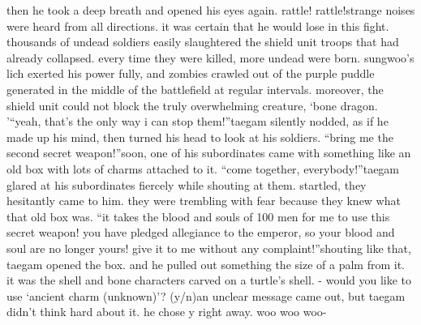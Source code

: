 then he took a deep breath and opened his eyes again.
rattle! rattle!strange noises were heard from all directions.
 it was certain that he would lose in this fight.
 thousands of undead soldiers easily slaughtered the shield unit troops that had already collapsed.
 every time they were killed, more undead were born.
 sungwoo’s lich exerted his power fully, and zombies crawled out of the purple puddle generated in the middle of the battlefield at regular intervals.
moreover, the shield unit could not block the truly overwhelming creature, ‘bone dragon.
’“yeah, that’s the only way i can stop them!”taegam silently nodded, as if he made up his mind, then turned his head to look at his soldiers.
“bring me the second secret weapon!”soon, one of his subordinates came with something like an old box with lots of charms attached to it.
“come together, everybody!”taegam glared at his subordinates fiercely while shouting at them.
startled, they hesitantly came to him.
 they were trembling with fear because they knew what that old box was.
“it takes the blood and souls of 100 men for me to use this secret weapon! you have pledged allegiance to the emperor, so your blood and soul are no longer yours! give it to me without any complaint!”shouting like that, taegam opened the box.
 and he pulled out something the size of a palm from it.
 it was the shell and bone characters carved on a turtle’s shell.
- would you like to use ‘ancient charm (unknown)’? (y/n)an unclear message came out, but taegam didn’t think hard about it.
he chose y right away.
woo woo woo-

 